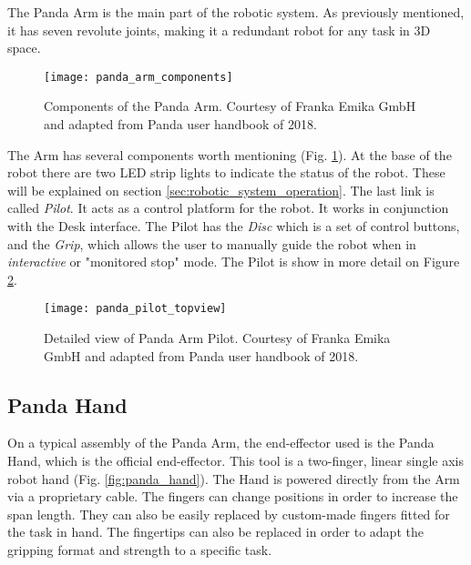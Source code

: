 The Panda Arm is the main part of the robotic system. As previously mentioned, it has seven revolute joints, making it a redundant robot for any task in 3D space.

\begin{figure}[htbp]
	\centering
	\texttt{[image: panda\_arm\_components]}
	\caption[Components of the Panda Arm.]{Components of the Panda Arm. Courtesy of Franka Emika GmbH and adapted from Panda user handbook of 2018.}
	\label{fig:panda_arm_components}
\end{figure}

The Arm has several components worth mentioning (Fig. \ref{fig:panda_arm_components}). At the base of the robot there are two LED strip lights to indicate the status of the robot. These will be explained on section \ref{sec:robotic_system_operation}. The last link is called \emph{Pilot}. It acts as a control platform for the robot. It works in conjunction with the Desk interface. The Pilot has the \emph{Disc} which is a set of control buttons, and the \emph{Grip}, which allows the user to manually guide the robot when in \emph{interactive} or "monitored stop" mode. The Pilot is show in more detail on Figure \ref{fig:panda_pilot_topview}.

\begin{figure}[htbp]
    \centering
	\texttt{[image: panda\_pilot\_topview]}
	\caption[Detailed view of Panda Arm Pilot.]{Detailed view of Panda Arm Pilot. Courtesy of Franka Emika GmbH and adapted from Panda user handbook of 2018.}
	\label{fig:panda_pilot_topview}
\end{figure}


\subsection*{Panda Hand}
\label{subsec:robotic_system_physical_description_panda_hand}

On a typical assembly of the Panda Arm, the end-effector used is the Panda Hand, which is the official end-effector. This tool is a two-finger, linear single axis robot hand (Fig. \ref{fig:panda_hand}). The Hand is powered directly from the Arm via a proprietary cable. The fingers can change positions in order to increase the span length. They can also be easily replaced by custom-made fingers fitted for the task in hand. The fingertips can also be replaced in order to adapt the gripping format and strength to a specific task.


